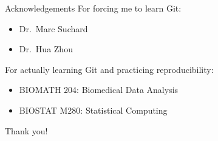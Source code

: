\documentclass{beamer}
\begin{document}
\begin{frame}{Acknowledgements}
  For forcing me to learn Git:
  \begin{itemize}
    \item Dr.\ Marc Suchard
    \item Dr.\ Hua Zhou
  \end{itemize}

  For actually learning Git and practicing reproducibility:
  \begin{itemize}
    \item BIOMATH 204: Biomedical Data Analysis
    \item BIOSTAT M280: Statistical Computing
  \end{itemize}

  \center Thank you!
\end{frame}
\end{document}
